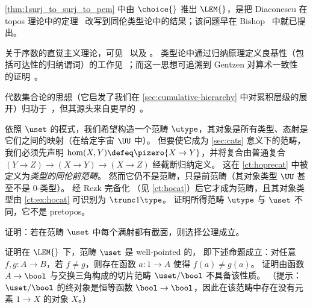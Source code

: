 \cref{thm:1surj_to_surj_to_pem} 中由 $\choice{}$ 推出 $\LEM{}$，是把 Diaconescu 在 topos 理论中的定理~\cite{Diaconescu} 改写到同伦类型论中的结果；该问题早在 Bishop~\cite[Problem~2]{Bishop1967} 中就已提出。

关于序数的直觉主义理论，可见~\cite{taylor:ordinals,Taylor99} 以及 \cite{JoyalMoerdijk1995}。
类型论中通过归纳原理定义良基性（包括可达性的归纳谓词）的工作见~\cite{Huet80,Paulson86,Nordstrom88}；而这一思想可追溯到 Gentzen 对算术一致性 的证明~\cite{Gentzen36}。

代数集合论的思想（它启发了我们在 \cref{sec:cumulative-hierarchy} 中对累积层级的展开）归功于~\cite{JoyalMoerdijk1995}，但其源头来自更早的~\cite{AczelCZF}。
%
%


\sectionExercises

\begin{ex}\label{ex:utype-ct}
  依照 $\uset$ 的模式，我们希望构造一个范畴 $\utype$，其对象是所有类型、态射是它们之间的映射（在给定宇宙 $\UU$ 中）。
  但要使它成为 \cref{sec:cats} 意义下的范畴，我们必须先声明 $\hom(X,Y) \defeq \pizero{X\to Y}$，并将复合由普通复合 $(Y\to Z) \to (X\to Y) \to (X\to Z)$ 经截断归纳定义。
  这在 \cref{ct:hoprecat} 中被定义为\emph{类型的同伦前范畴}。
  然而它仍不是范畴，只是前范畴（其对象类型 $\UU$ 甚至不是 0-类型）。
  经 Rezk 完备化
  （见 \cref{ct:hocat}）后它才成为范畴，且其对象类型由 \cref{ct:ex:hocat} 可识别为 $\trunc1\type$。
  证明所得范畴 $\utype$ 与 $\uset$ 不同，它不是 pretopos。
\end{ex}

\begin{ex}\label{ex:surjections-have-sections-impl-ac}
  证明：若在范畴 $\uset$ 中每个满射都有截面，则选择公理成立。
\end{ex}

\begin{ex}\label{ex:well-pointed}
  证明在 $\LEM{}$ 下，范畴 $\uset$ 是 well-pointed 的，
  即下述命题成立：对任意 $f, g : A\to B$，若 $f \neq g$，则存在函数 $a : 1\to A$ 使得 $f(a) \neq g(a)$。
  证明由函数 $A\to \bool$ 与交换三角构成的切片范畴
  $\uset/\bool$ 不具备该性质。
  （提示：$\uset/\bool$ 的终对象是恒等函数 $\bool \to \bool$，因此在该范畴中存在没有元素 $1\to X$ 的对象 $X$。）
\end{ex}

